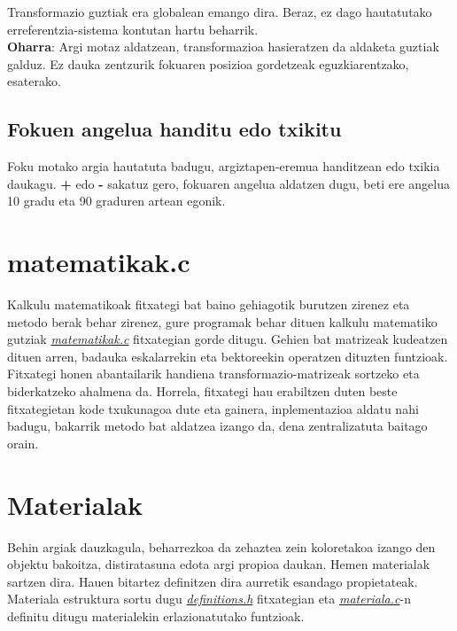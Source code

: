 \documentclass[12pt]{article}
\newcommand{\fitxategi}[1] {\underline{\textit{#1}}}
\newcommand{\tekla}[1] {\textbf{#1}}
\begin{document}
Transformazio guztiak era globalean emango dira. Beraz, ez dago hautatutako erreferentzia-sistema kontutan hartu beharrik.\\

\textbf{Oharra}: Argi motaz aldatzean, transformazioa hasieratzen da aldaketa guztiak galduz. Ez dauka zentzurik fokuaren posizioa gordetzeak eguzkiarentzako, esaterako.

\subsection{Fokuen angelua handitu edo txikitu}

Foku motako argia hautatuta badugu, argiztapen-eremua handitzean edo txikia daukagu. \tekla{+} edo \tekla{-} sakatuz gero, fokuaren angelua aldatzen dugu, beti ere angelua 10 gradu eta 90 graduren artean egonik.

\section{matematikak.c}\label{matematikak}

Kalkulu matematikoak fitxategi bat baino gehiagotik burutzen zirenez eta metodo berak behar zirenez, gure programak behar dituen kalkulu matematiko gutziak \fitxategi{matematikak.c} fitxategian gorde ditugu. Gehien bat matrizeak kudeatzen dituen arren, badauka eskalarrekin eta bektoreekin operatzen dituzten funtzioak.\\

Fitxategi honen abantailarik handiena transformazio-matrizeak sortzeko eta biderkatzeko ahalmena da. Horrela, fitxategi hau erabiltzen duten beste fitxategietan kode txukunagoa dute eta gainera, inplementazioa aldatu nahi badugu, bakarrik metodo bat aldatzea izango da, dena zentralizatuta baitago orain.\\

\section{Materialak}

Behin argiak dauzkagula, beharrezkoa da zehaztea zein koloretakoa izango den objektu bakoitza, distiratasuna edota argi propioa daukan. Hemen materialak sartzen dira. Hauen bitartez definitzen dira aurretik esandago propietateak.\\

Materiala estruktura sortu dugu \fitxategi{definitions.h} fitxategian eta \fitxategi{materiala.c}-n definitu ditugu materialekin erlazionatutako funtzioak.\\
\end{document}
